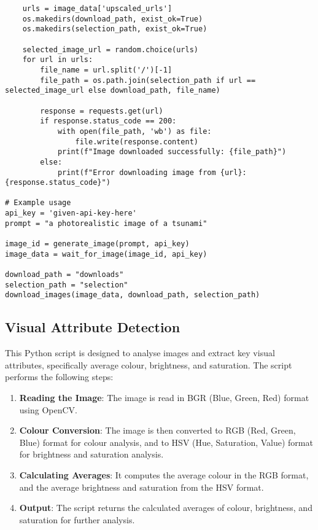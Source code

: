 \begin{lstlisting}
    urls = image_data['upscaled_urls']
    os.makedirs(download_path, exist_ok=True)
    os.makedirs(selection_path, exist_ok=True)

    selected_image_url = random.choice(urls)
    for url in urls:
        file_name = url.split('/')[-1]
        file_path = os.path.join(selection_path if url == selected_image_url else download_path, file_name)

        response = requests.get(url)
        if response.status_code == 200:
            with open(file_path, 'wb') as file:
                file.write(response.content)
            print(f"Image downloaded successfully: {file_path}")
        else:
            print(f"Error downloading image from {url}: {response.status_code}")

# Example usage
api_key = 'given-api-key-here'
prompt = "a photorealistic image of a tsunami"

image_id = generate_image(prompt, api_key)
image_data = wait_for_image(image_id, api_key)

download_path = "downloads"
selection_path = "selection"
download_images(image_data, download_path, selection_path)

\end{lstlisting}



\subsection{Visual Attribute Detection}

This Python script is designed to analyse images and extract key visual attributes, specifically average colour, brightness, and saturation. The script performs the following steps:

\begin{enumerate}
    \item \textbf{Reading the Image}: The image is read in BGR (Blue, Green, Red) format using OpenCV.
    \item \textbf{Colour Conversion}: The image is then converted to RGB (Red, Green, Blue) format for colour analysis, and to HSV (Hue, Saturation, Value) format for brightness and saturation analysis.
    \item \textbf{Calculating Averages}: It computes the average colour in the RGB format, and the average brightness and saturation from the HSV format.
    \item \textbf{Output}: The script returns the calculated averages of colour, brightness, and saturation for further analysis.
\end{enumerate}

